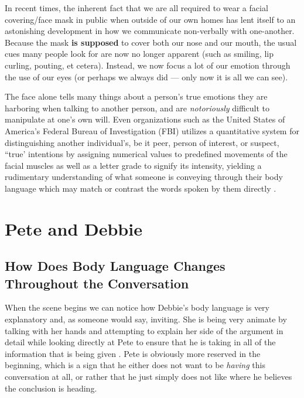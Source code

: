 \documentclass[stu,12pt]{apa7}
\begin{document}
      In recent times, the inherent fact that we are all required to wear a
        facial covering/face mask in public when outside of our own homes has
        lent itself to an astonishing development in how we communicate
        non-verbally with one-another. Because the mask \textbf{is supposed}
        to cover both our nose and our mouth, the usual cues many people look
        for are now no longer apparent (such as smiling, lip curling, pouting,
        et cetera). Instead, we now focus a lot of our emotion through the use
        of our eyes (or perhaps we always did --- only now it is all we can
        see).

      The face alone tells many things about a person's true emotions they are
        harboring when talking to another person, and are \textit{notoriously}
        difficult to manipulate at one's own will. Even organizations such as
        the United States of America's Federal Bureau of Investigation (FBI)
        utilizes a quantitative system for distinguishing another individual's,
        be it peer, person of interest, or suspect, ``true' intentions by
        assigning numerical values to predefined movements of the facial muscles
        as well as a letter grade to signify its intensity, yielding a
        rudimentary understanding of what someone is conveying through their
        body language which may match or contrast the words spoken by them
        directly \parencite[pp. 209]{cohn_observer-based_2007}.


  \section{Pete and Debbie}
    \subsection{How Does Body Language Changes Throughout the Conversation}
      When the scene begins we can notice how Debbie's body language is very
        explanatory and, as someone would say, inviting. She is being very
        animate by talking with her hands and attempting to explain her side
        of the argument in detail while looking directly at Pete to ensure
        that he is taking in all of the information that is being
        given \parencite{apatow_this_2012}. Pete is obviously more reserved in
        the beginning, which is a sign that he either does not want to be
        \textit{having} this conversation at all, or rather that he just simply
        does not like where he believes the conclusion is heading.
\end{document}
